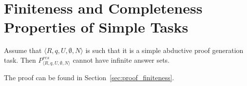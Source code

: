\section{Finiteness and Completeness Properties of Simple Tasks}

\begin{theorem}[Finiteness]\label{thm:finiteness}
Assume that $\langle R,q,U,\emptyset,N \rangle$ is such that it is a simple abductive proof generation task. %
Then $P_{\langle R,q,U,\emptyset,N \rangle}^{res}$ cannot have infinite answer sets. 
\end{theorem}

The proof can be found in Section~\ref{sec:proof_finiteness}.

